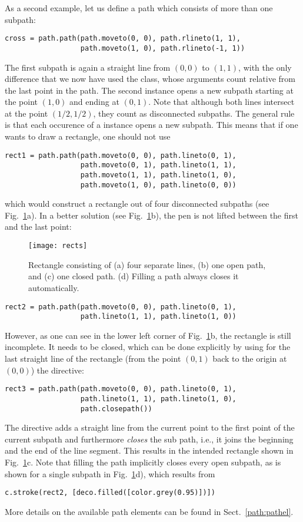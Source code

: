 As a second example, let us define a path which consists of more than 
one subpath:
\begin{verbatim}
cross = path.path(path.moveto(0, 0), path.rlineto(1, 1),
                  path.moveto(1, 0), path.rlineto(-1, 1))
\end{verbatim}
The first subpath is again a straight line from $(0, 0)$ to $(1, 1)$,
with the only difference that we now have used the 
class, whose arguments count relative from the last point in the path.
The second  instance opens a new subpath starting at the
point $(1, 0)$ and ending at $(0, 1)$. Note that although both lines
intersect at the point $(1/2, 1/2)$, they count as disconnected
subpaths.  The general rule is that each occurence of a 
instance opens a new subpath. This means that if one wants to draw a
rectangle, one should not use
\begin{verbatim}
rect1 = path.path(path.moveto(0, 0), path.lineto(0, 1),
                  path.moveto(0, 1), path.lineto(1, 1),
                  path.moveto(1, 1), path.lineto(1, 0),
                  path.moveto(1, 0), path.lineto(0, 0))
\end{verbatim}
which would construct a rectangle out of four disconnected
subpaths (see Fig.~\ref{fig:rects}a). In a better solution (see
Fig.~\ref{fig:rects}b), the pen is not lifted between the first and
the last point:
%
\begin{figure}
\centerline{\texttt{[image: rects]}}
\caption{Rectangle consisting of (a) four separate lines, (b) one open
  path, and (c) one closed path. (d) Filling a
  path always closes it automatically.}
\label{fig:rects}
\end{figure}
%
\begin{verbatim}
rect2 = path.path(path.moveto(0, 0), path.lineto(0, 1), 
                  path.lineto(1, 1), path.lineto(1, 0))
\end{verbatim}
However, as one can see in the lower left corner of
Fig.~\ref{fig:rects}b, the rectangle is still incomplete.  It needs to
be closed, which can  be done explicitly by using for the last straight
line of the rectangle (from the point $(0, 1)$ back to the origin at $(0, 0)$)
the  directive:
\begin{verbatim}
rect3 = path.path(path.moveto(0, 0), path.lineto(0, 1), 
                  path.lineto(1, 1), path.lineto(1, 0),
                  path.closepath())
\end{verbatim}
The  directive adds a straight line from the current
point to the first point of the current subpath and furthermore
\textit{closes} the sub path, i.e., it joins the beginning and the end
of the line segment. This results in the intended rectangle shown in
Fig.~\ref{fig:rects}c. Note that filling the path implicitly closes
every open subpath, as is shown for a single subpath in
Fig.~\ref{fig:rects}d), which results from
\begin{verbatim}
c.stroke(rect2, [deco.filled([color.grey(0.95)])])
\end{verbatim}
More details on the available path elements can be found in
Sect.~\ref{path:pathel}.

